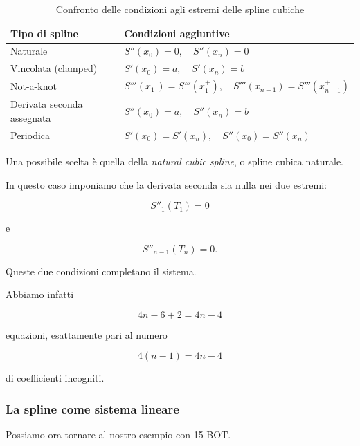 \begin{table}[htbp]
\centering
\caption{Confronto delle condizioni agli estremi delle spline cubiche}
\label{tab:condizioni_spline}
\renewcommand{\arraystretch}{1.5}
\begin{tabular}{ll}
\toprule
\textbf{Tipo di spline} & \textbf{Condizioni aggiuntive} \\
\midrule
Naturale & $S''(x_0)=0,\quad S''(x_n)=0$ \\
Vincolata (clamped) & $S'(x_0)=a,\quad S'(x_n)=b$ \\
Not-a-knot & $S'''(x_1^-)=S'''(x_1^+),\quad S'''(x_{n-1}^-)=S'''(x_{n-1}^+)$ \\
Derivata seconda assegnata & $S''(x_0)=a,\quad S''(x_n)=b$ \\
Periodica & $S'(x_0)=S'(x_n),\quad S''(x_0)=S''(x_n)$ \\
\bottomrule
\end{tabular}
\label{tab:spline2cond}
\end{table}


Una possibile scelta è quella della \emph{natural cubic spline}, o
spline cubica naturale.

In questo caso imponiamo che la derivata seconda sia nulla nei due
estremi:

\begin{equation*}
    S''_1(T_1)=0
\end{equation*}

e

\begin{equation*}
    S''_{n-1}(T_n)=0.
\end{equation*}

Queste due condizioni completano il sistema.

Abbiamo infatti

\begin{equation*}
    4n-6+2=4n-4
\end{equation*}

equazioni, esattamente pari al numero

\begin{equation*}
    4(n-1)=4n-4
\end{equation*}

di coefficienti incogniti.


\subsubsection{La spline come sistema lineare}

Possiamo ora tornare al nostro esempio con 15 BOT.

